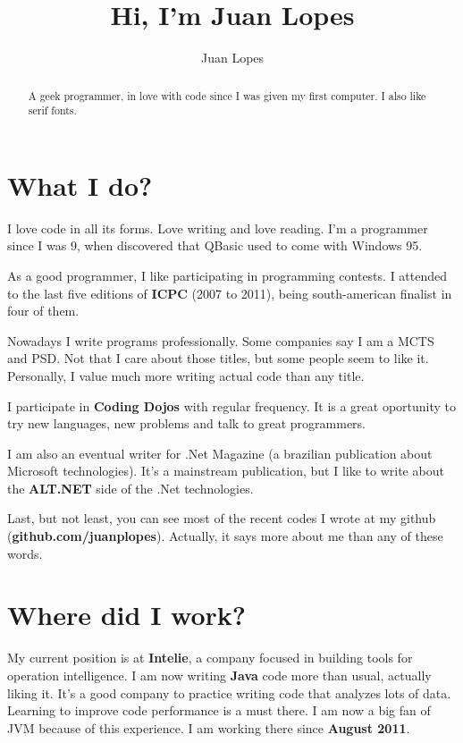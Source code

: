 \documentclass[a4paper,12pt,notitlepage]{article}
\begin{document}
\title{Hi, I'm Juan Lopes}
\author{Juan Lopes}
\renewcommand{\abstractname}{}

\maketitle

\begin{abstract}
\begin{center}
A geek programmer, in love with code since I was given my first computer.
I also like serif fonts.
\end{center}
\end{abstract}


\section{What I do?}

	I love code in all its forms. Love writing and love reading. I'm a programmer since I was 9, when discovered that QBasic used to come with Windows 95. 
	
	As a good programmer, I like participating in programming contests. I attended to the last five editions of \textbf{ICPC} (2007 to 2011), being south-american finalist in four of them.
	
	Nowadays I write programs professionally. Some companies say I am a MCTS and PSD. Not that I care about those titles, but some people seem to like it. Personally, I value much more writing actual code than any title.
	
	I participate in \textbf{Coding Dojos} with regular frequency. It is a great oportunity to try new languages, new problems and talk to great programmers.
	
	I am also an eventual writer for .Net Magazine (a brazilian publication about Microsoft technologies). It's a mainstream publication, but I like to write about the \textbf{ALT.NET} side of the .Net technologies.
	
	Last, but not least, you can see most of the recent codes I wrote at my github (\textbf{github.com/juanplopes}). Actually, it says more about me than any of these words.
	
\section{Where did I work?}

	My current position is at \textbf{Intelie}, a company focused in building tools for operation intelligence. I am now writing \textbf{Java} code more than usual, actually liking it. It's a good company to practice writing code that analyzes lots of data. Learning to improve code performance is a must there. I am now a big fan of JVM because of this experience. I am working there since \textbf{August 2011}.
	
\end{document}
